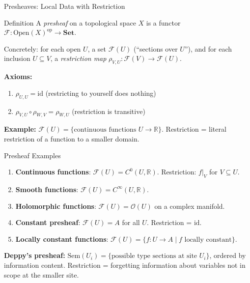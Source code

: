 \documentclass[aspectratio=169,10pt]{beamer}
\newcommand{\Fscr}{\mathcal{F}}
\newcommand{\Oscr}{\mathcal{O}}
\newcommand{\Sem}{\mathrm{Sem}}
\newcommand{\op}{\mathrm{op}}
\newcommand{\id}{\mathrm{id}}
\newcommand{\Set}{\mathbf{Set}}
\newcommand{\Open}{\mathrm{Open}}
\begin{document}
\begin{frame}{Presheaves: Local Data with Restriction}
\begin{block}{Definition}
A \emph{presheaf} on a topological space $X$ is a functor $\Fscr : \Open(X)^{\op} \to \Set$.

Concretely: for each open $U$, a set $\Fscr(U)$ (``sections over $U$''), and for each inclusion $U \subseteq V$, a \emph{restriction map} $\rho_{V,U} : \Fscr(V) \to \Fscr(U)$.
\end{block}

\textbf{Axioms:}
\begin{enumerate}
  \item $\rho_{U,U} = \id$ (restricting to yourself does nothing)
  \item $\rho_{V,U} \circ \rho_{W,V} = \rho_{W,U}$ (restriction is transitive)
\end{enumerate}

\textbf{Example:} $\Fscr(U) = \{\text{continuous functions } U \to \mathbb{R}\}$. Restriction = literal restriction of a function to a smaller domain.
\end{frame}

\begin{frame}{Presheaf Examples}
\begin{enumerate}
  \item \textbf{Continuous functions}: $\Fscr(U) = C^0(U, \mathbb{R})$.
        Restriction: $f|_V$ for $V \subseteq U$.

  \item \textbf{Smooth functions}: $\Fscr(U) = C^\infty(U, \mathbb{R})$.

  \item \textbf{Holomorphic functions}: $\Fscr(U) = \Oscr(U)$ on a complex manifold.

  \item \textbf{Constant presheaf}: $\Fscr(U) = A$ for all $U$. Restriction = $\id$.

  \item \textbf{Locally constant functions}: $\Fscr(U) = \{f : U \to A \mid f \text{ locally constant}\}$.
\end{enumerate}

\vspace{0.5em}
\textbf{Deppy's presheaf:} $\Sem(U_i) = \{\text{possible type sections at site } U_i\}$, ordered by information content. Restriction = forgetting information about variables not in scope at the smaller site.
\end{frame}
\end{document}
